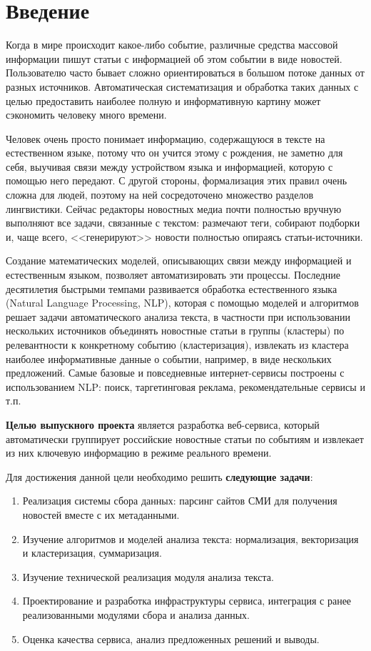 \documentclass[a4paper, 14pt]{extarticle}
\begin{document}
\tableofcontents %
\clearpage

\section{Введение}


Когда в мире происходит какое-либо событие, различные средства массовой информации
пишут статьи с информацией об этом событии в виде новостей. Пользователю часто бывает сложно ориентироваться в большом потоке данных от разных источников. Автоматическая систематизация и обработка таких данных с целью предоставить наиболее полную и информативную картину может сэкономить человеку много времени. 

Человек очень просто понимает информацию, содержащуюся в тексте на естественном языке, потому что он учится этому с рождения, не заметно для себя, выучивая связи между устройством языка и информацией, которую с помощью него передают. С другой стороны, формализация этих правил очень сложна для людей, поэтому на ней сосредоточено множество разделов лингвистики. Сейчас редакторы новостных медиа почти полностью вручную выполняют все задачи, связанные с текстом: размечают теги, собирают подборки и, чаще всего, <<генерируют>> новости полностью опираясь статьи-источники.

Создание математических моделей, описывающих связи между информацией и естественным языком, позволяет автоматизировать эти процессы. Последние десятилетия быстрыми темпами развивается обработка естественного языка (Natural Language Processing, NLP), которая с помощью моделей и алгоритмов решает задачи автоматического анализа текста, в частности при использовании нескольких источников объединять новостные статьи в группы (кластеры) по релевантности к конкретному событию (кластеризация), извлекать из кластера наиболее информативные данные о событии, например, в виде нескольких предложений. Самые базовые и повседневные интернет-сервисы построены с использованием NLP: поиск, таргетинговая реклама, рекомендательные сервисы и т.п.

{\bf Целью выпускного проекта} является разработка веб-сервиса, который автоматически
группирует российские новостные статьи по событиям и извлекает из них ключевую информацию в режиме реального времени. 

Для достижения данной цели необходимо решить {\bf следующие задачи}:
\begin{enumerate}
	\item Реализация системы сбора данных: парсинг сайтов СМИ для получения новостей вместе с их метаданными.
	\item Изучение алгоритмов и моделей анализа текста: нормализация, векторизация и кластеризация, суммаризация.
	\item Изучение технической реализация модуля анализа текста.
	\item Проектирование и разработка инфраструктуры сервиса, интеграция с ранее реализованными модулями сбора и анализа данных.
	\item Оценка качества сервиса, анализ предложенных решений и выводы.
\end{enumerate}
\end{document}
